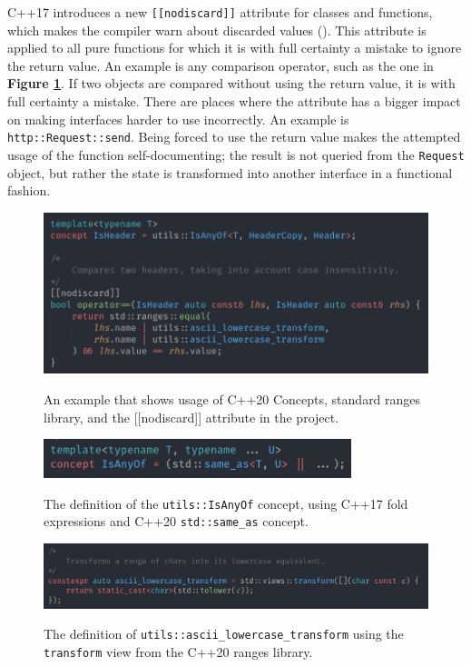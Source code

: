 \documentclass[12pt, a4paper]{article}
\begin{document}
C++17 introduces a new \texttt{[[nodiscard]]} attribute for classes and functions, which makes the compiler warn about discarded values (\cite{CppNodiscard}). This attribute is applied to all pure functions for which it is with full certainty a mistake to ignore the return value. An example is any comparison operator, such as the one in \textbf{Figure \ref{fig:constraints_example}}. If two objects are compared without using the return value, it is with full certainty a mistake. There are places where the attribute has a bigger impact on making interfaces harder to use incorrectly. An example is \texttt{http::Request::send}. Being forced to use the return value makes the attempted usage of the function self-documenting; the result is not queried from the \texttt{Request} object, but rather the state is transformed into another interface in a functional fashion.

\begin{figure}[hp]
	\centering
	\caption{An example that shows usage of C++20 Concepts, standard ranges library, and the [[nodiscard]] attribute in the project.}
	\includegraphics[width=\textwidth]{constraints_example}
	\label{fig:constraints_example}
\end{figure}

\begin{figure}[hp]
	\centering
	\caption{The definition of the \texttt{utils::IsAnyOf} concept, using C++17 fold expressions and C++20 \texttt{std::same\_as} concept.}
	\includegraphics[width=0.8\textwidth]{is_any_of_concept}
	\label{fig:is_any_of_concept}
\end{figure}

\begin{figure}[hp]
	\centering
	\caption{The definition of \texttt{utils::ascii\_lowercase\_transform} using the \texttt{transform} view from the C++20 ranges library.}
	\includegraphics[width=\textwidth]{lowercase_transform_definition}
	\label{fig:lowercase_transform_definition}
\end{figure}
\end{document}

